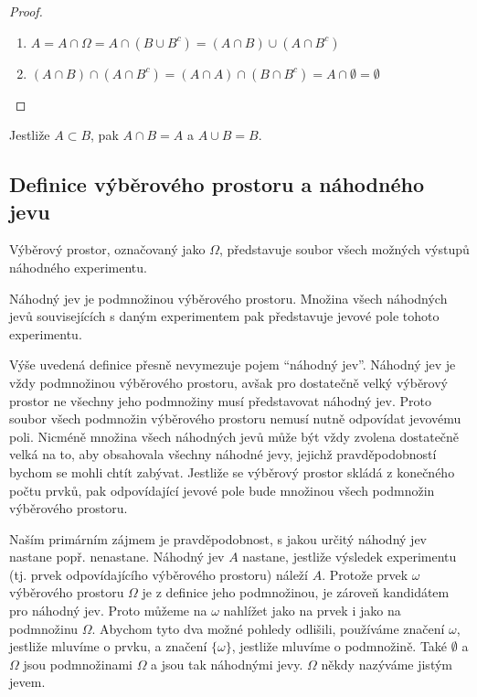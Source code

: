 \begin{proof}
~
\begin{enumerate}
\item $A = A \cap \Omega = A \cap (B \cup B^c) = (A \cap B) \cup (A \cap B^c)$
\item $(A \cap B) \cap (A \cap B^c) = (A \cap A) \cap (B \cap B^c) = A \cap \emptyset = \emptyset$
\end{enumerate}
\end{proof}
\begin{theorem}
Jestliže $A \subset B$, pak $A \cap B = A$ a $A \cup B = B$.
\end{theorem}

\subsection{Definice výběrového prostoru a náhodného jevu}

\begin{definition}
Výběrový prostor, označovaný jako $\Omega$, představuje soubor všech možných výstupů náhodného experimentu.
\end{definition}

\begin{definition}
Náhodný jev je podmnožinou výběrového prostoru. Množina všech náhodných jevů souvisejících s daným experimentem pak představuje jevové pole tohoto experimentu.
\end{definition}

Výše uvedená definice přesně nevymezuje pojem ``náhodný jev''. Náhodný jev je vždy podmnožinou výběrového prostoru, avšak pro dostatečně velký výběrový prostor ne všechny jeho podmnožiny musí představovat náhodný jev. Proto soubor všech podmnožin výběrového prostoru nemusí nutně odpovídat jevovému poli. Nicméně množina všech náhodných jevů může být vždy zvolena dostatečně velká na to, aby obsahovala všechny náhodné jevy, jejichž pravděpodobností bychom se mohli chtít zabývat. Jestliže se výběrový prostor skládá z konečného počtu prvků, pak odpovídající jevové pole bude množinou všech podmnožin výběrového prostoru.

Naším primárním zájmem je pravděpodobnost, s jakou určitý náhodný jev nastane popř. nenastane. Náhodný jev $A$ nastane, jestliže výsledek experimentu (tj. prvek odpovídajícího výběrového prostoru) náleží $A$. Protože prvek $\omega$ výběrového prostoru $\Omega$ je z definice jeho podmnožinou, je zároveň kandidátem pro náhodný jev. Proto můžeme na $\omega$ nahlížet jako na prvek i jako na podmnožinu $\Omega$. Abychom tyto dva možné pohledy odlišili, používáme značení $\omega$, jestliže mluvíme o prvku, a značení $\{\omega\}$, jestliže mluvíme o podmnožině. Také $\emptyset$ a $\Omega$  jsou podmnožinami $\Omega$ a jsou tak náhodnými jevy. $\Omega$ někdy nazýváme jistým jevem.

